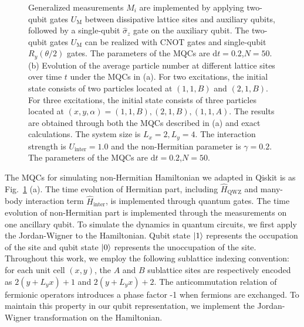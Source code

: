 \documentclass[longbibliography, aps, prx, amsmath, amssymb, amsfonts, twocolumn,superscriptaddress, footinbib]{revtex4-1}
\begin{document}
\begin{figure}[htbp]
{		Generalized measurements $M_i$ are implemented by applying two-qubit gates $U_{\text{M}}$ between dissipative lattice sites and auxiliary qubits, followed by a single-qubit $\hat{\sigma}_z$ gate on the auxiliary qubit.
		The two-qubit gates $U_{\text{M}}$ can be realized with CNOT gates and single-qubit $R_y(\theta/2)$ gates. The parameters of the MQCs are $\mathrm{d}t=0.2$,$N=50$.
		(b) Evolution of the average particle number at different lattice sites over time $t$ under the MQCs in (a). 
		For two excitations, the initial state consists of two particles located at $(1,1,B)$ and $(2,1,B)$. For three excitations, the initial state consists of three particles located at $(x,y,\alpha)=(1,1,B), (2,1,B), (1,1,A)$.
		The results are obtained through both the MQCs described in (a) and exact calculations. The system size is $L_x=2,L_y=4$. The interaction strength is $U_{\text{inter}}=1.0$ and the non-Hermitian parameter is $\gamma=0.2$. The parameters of the MQCs are $\mathrm{d}t=0.2$,$N=50$.
		}
		\label{fig:04}
	\end{figure}
	The MQCs for simulating non-Hermitian Hamiltonian we adapted in Qiskit is as Fig.~\ref{fig:04} (a). The time evolution of Hermitian part, including $\hat{H}_{\text{QWZ}}$ and many-body interaction term $\hat{H}_{\text{inter}}$, is implemented through quantum gates. The time evolution of non-Hermitian part is implemented through the measurements on one ancillary qubit. 
	To simulate the dynamics in quantum circuits, we first apply the Jordan-Wigner to the Hamiltonian. 
	Qubit state $\ket{1}$ represents the occupation of the site and qubit state $\ket{0}$ represents the unoccupation of the site. 
	Throughout this work, we employ the following sublattice indexing convention: for each unit cell $(x,y)$, the $A$ and $B$ sublattice sites are respectively encoded as $2(y+L_y x)+1$ and $2(y+L_y x)+2$.
	The anticommutation relation of fermionic operators introduces a phase factor -1 when fermions are exchanged. To maintain this property in our qubit representation, we implement the Jordan-Wigner transformation on the Hamiltonian.
\end{document}
